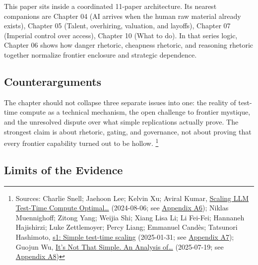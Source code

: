 \documentclass[
  american,
  11pt,
  letterpaper,
]{article}
\begin{document}
This paper sits inside a coordinated 11-paper architecture. Its nearest
companions are Chapter 04 (AI arrives when the human raw material
already exists), Chapter 05 (Talent, overhiring, valuation, and
layoffs), Chapter 07 (Imperial control over access), Chapter 10 (What to
do). In that series logic, Chapter 06 shows how danger rhetoric,
cheapness rhetoric, and reasoning rhetoric together normalize frontier
enclosure and strategic dependence.

\subsection{Counterarguments}\label{counterarguments-6}

The chapter should not collapse three separate issues into one: the
reality of test-time compute as a technical mechanism, the open
challenge to frontier mystique, and the unresolved dispute over what
simple replications actually prove. The strongest claim is about
rhetoric, gating, and governance, not about proving that every frontier
capability turned out to be hollow. \footnote{Sources: Charlie Snell;
  Jaehoon Lee; Kelvin Xu; Aviral Kumar,
  \href{https://arxiv.org/abs/2408.03314}{Scaling LLM Test-Time Compute
  Optimal\ldots{}} (2024-08-06; see
  \hyperref[ch-06-appendix-a6-scaling-llm-test-time-compute-optimally-can-be-more-effective-than-scaling-model-parameters]{Appendix
  A6}); Niklas Muennighoff; Zitong Yang; Weijia Shi; Xiang Lisa Li; Li
  Fei-Fei; Hannaneh Hajishirzi; Luke Zettlemoyer; Percy Liang; Emmanuel
  Candès; Tatsunori Hashimoto,
  \href{https://arxiv.org/abs/2501.19393}{s1: Simple test-time scaling}
  (2025-01-31; see
  \hyperref[ch-06-appendix-a7-s1-simple-test-time-scaling]{Appendix
  A7}); Guojun Wu, \href{https://arxiv.org/abs/2507.14419}{It's Not That
  Simple. An Analysis of\ldots{}} (2025-07-19; see
  \hyperref[ch-06-appendix-a8-it-s-not-that-simple-an-analysis-of-simple-test-time-scaling]{Appendix
  A8})}

\subsection{Limits of the Evidence}\label{limits-of-the-evidence-6}
\end{document}

